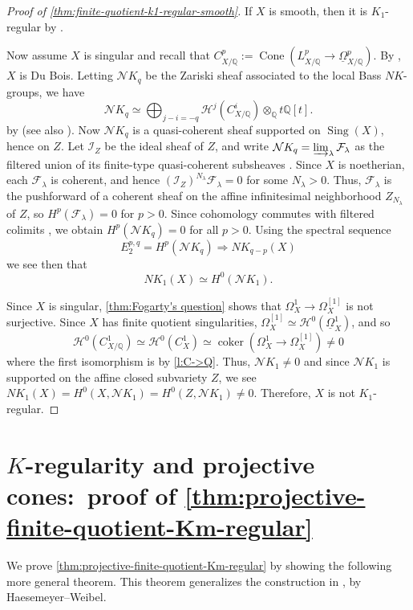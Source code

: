 \documentclass{amsart}
\theoremstyle{definition}
\newcommand{\QQ}{\mathbb{Q}}
\newcommand{\cF}{\mathcal{F}}
\newcommand{\cH}{\mathcal{H}}
\newcommand{\cI}{\mathcal{I}}
\newcommand{\cN}{\mathcal{N}}
\DeclareMathOperator{\coker}{coker}
\DeclareMathOperator{\Cone}{Cone}
\DeclareMathOperator{\Sing}{Sing}
\begin{document}
\begin{proof}[{Proof of \autoref{thm:finite-quotient-k1-regular-smooth}}]
If $X$ is smooth, then it is $K_1$-regular by \cite[\S4 Theorem 3 Corollary 2 and \S7 Proposition 4.1]{Quillen1973}.

Now assume $X$ is singular and recall that $C_{X/\mathbb{Q}}^p:=\Cone(L^p_{X/\mathbb{Q}}\longrightarrow\underline{\Omega}_{X/\mathbb{Q}}^p)$. By \cite[Theorem S]{Kovacs1999}, $X$ is Du Bois. Letting $\cN K_q$ be the Zariski sheaf associated to the local Bass $NK$-groups, we have
\[
    \cN K_q\simeq\bigoplus_{j-i=-q}\cH^j(C_{X/\mathbb{Q}}^i)\otimes_\QQ t\QQ[t].
\]
by \cite{CHWW} (see also \cite[Theorem~2.10]{Shen2025}). Now $\cN K_q$ is a quasi-coherent sheaf supported on $\Sing(X)$, hence on $Z$. Let $\cI_Z$ be the ideal sheaf of $Z$, and write $\cN K_q=\varinjlim_\lambda\cF_\lambda$ as the filtered union of its finite-type quasi-coherent subsheaves \cite[Tag~01PG]{stacks-project}. Since $X$ is noetherian, each $\cF_\lambda$ is coherent, and hence $(\cI_Z)^{N_\lambda}\cF_\lambda=0$ for some $N_\lambda>0$. Thus, $\cF_\lambda$ is the pushforward of a coherent sheaf on the affine infinitesimal neighborhood $Z_{N_\lambda}$ of $Z$, so $H^p(\cF_\lambda)=0$ for $p>0$. Since cohomology commutes with filtered colimits \cite[Tag~01FF]{stacks-project}, we obtain $H^p(\cN K_q)=0$ for all $p>0$. Using the spectral sequence
\[
    E_2^{p,q}=H^p(\cN K_q)\Longrightarrow NK_{q-p}(X)
\]
we see then that
\[
    NK_1(X)\simeq H^0(\cN K_1).
\]

Since $X$ is singular, \autoref{thm:Fogarty's question} shows that $\Omega_X^1\longrightarrow\Omega_X^{[1]}$ is not surjective. Since $X$ has finite quotient singularities, $\Omega_X^{[1]}\simeq \cH^0(\underline{\Omega}_X^1)$, and so
\[
    \cH^0(C_{X/\mathbb{Q}}^1)\simeq\cH^0(C_X^1)\simeq\coker(\Omega_X^1\longrightarrow\Omega_X^{[1]})\neq0
\]
where the first isomorphism is by \autoref{l:C->Q}. Thus, $\cN K_1\neq0$ and since $\cN K_1$ is supported on the affine closed subvariety $Z$, we see $NK_1(X)=H^0(X,\cN K_1)=H^0(Z,\cN K_1)\neq0$. Therefore, $X$ is not $K_1$-regular.
\end{proof}


\section{$K$-regularity and projective cones:~proof of \autoref{thm:projective-finite-quotient-Km-regular}}

We prove \autoref{thm:projective-finite-quotient-Km-regular} by showing the following more general theorem. This theorem generalizes the construction in \cite[Theorem 4.3]{HaesemeyerWeibelLineBundles}, by Haesemeyer--Weibel.
\end{document}
